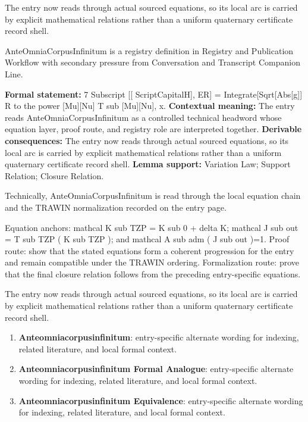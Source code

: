 The entry now reads through actual sourced equations, so its local arc is carried by explicit mathematical relations rather than a uniform quaternary certificate record shell.
\clearpage


\begingroup\small
{}
AnteOmniaCorpusInfinitum is a registry definition in Registry and Publication Workflow with secondary pressure from Conversation and Transcript Companion Line.

\begingroup\footnotesize\setlength{\emergencystretch}{3em}\sloppy
\textbf{Formal statement:} 7 Subscript [[ ScriptCapitalH], ER] = Integrate[Sqrt[Abs[g]] R to the power [Mu][Nu] T sub [Mu][Nu], x. \textbf{Contextual meaning:} The entry reads AnteOmniaCorpusInfinitum as a controlled technical headword whose equation layer, proof route, and registry role are interpreted together. \textbf{Derivable consequences:} The entry now reads through actual sourced equations, so its local arc is carried by explicit mathematical relations rather than a uniform quaternary certificate record shell. \textbf{Lemma support:} Variation Law; Support Relation; Closure Relation.\par
\endgroup

Technically, AnteOmniaCorpusInfinitum is read through the local equation chain and the TRAWIN normalization recorded on the entry page.

Equation anchors: mathcal K sub TZP = K sub 0 + delta K; mathcal J sub out = T sub TZP ( K sub TZP ); and mathcal A sub adm ( J sub out )=1. Proof route: show that the stated equations form a coherent progression for the entry and remain compatible under the TRAWIN ordering. Formalization route: prove that the final closure relation follows from the preceding entry-specific equations.

The entry now reads through actual sourced equations, so its local arc is carried by explicit mathematical relations rather than a uniform quaternary certificate record shell.
\endgroup

\begin{enumerate}[leftmargin=1.6em,itemsep=6pt,topsep=4pt]
\item \textbf{Anteomniacorpusinfinitum}: entry-specific alternate wording for indexing, related literature, and local formal context.
\item \textbf{Anteomniacorpusinfinitum Formal Analogue}: entry-specific alternate wording for indexing, related literature, and local formal context.
\item \textbf{Anteomniacorpusinfinitum Equivalence}: entry-specific alternate wording for indexing, related literature, and local formal context.
\end{enumerate}

